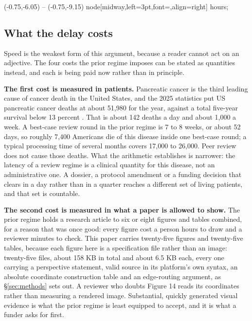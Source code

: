 \begin{appfloat}[!tb]
\begin{appfig}
  (-0.75,-6.05) -- (-0.75,-9.15) node[midway,left=3pt,font=\tiny\sffamily,align=right] {hours};
\end{appfig}
\vspace{-0.6cm}
\end{appfloat}

\subsection{What the delay costs}

Speed is the weakest form of this argument, because a reader cannot act on an
adjective. The four costs the prior regime imposes can be stated as quantities
instead, and each is being paid now rather than in principle.

\textbf{The first cost is measured in patients.} Pancreatic cancer is the third
leading cause of cancer death in the United States, and the 2025 statistics put
US pancreatic cancer deaths at about 51,980 for the year, against a total
five-year survival below 13 percent \cite{siegel2025statistics}. That is about
142 deaths a day and about 1,000 a week. A best-case review round in the prior
regime is 7 to 8 weeks, or about 52 days, so roughly 7,400 Americans die of this
disease inside one best-case round; a typical processing time of several months
covers 17,000 to 26,000. Peer review does not cause those deaths. What the
arithmetic establishes is narrower: the latency of a review regime is a clinical
quantity for this disease, not an administrative one. A dossier, a protocol
amendment or a funding decision that clears in a day rather than in a quarter
reaches a different set of living patients, and that set is countable.

\textbf{The second cost is measured in what a paper is allowed to show.} The
prior regime holds a research article to six or eight figures and tables
combined, for a reason that was once good: every figure cost a person hours to
draw and a reviewer minutes to check. This paper carries twenty-five figures and
twenty-five tables, because each figure here is a specification file rather than
an image: twenty-five files, about 158 KB in total and about 6.5 KB each, every
one carrying a perspective statement, valid source in its platform's own syntax,
an absolute coordinate construction table and an edge-routing argument, as
\S\ref{sec:methods} sets out. A reviewer who doubts Figure 14 reads its
coordinates rather than measuring a rendered image. Substantial, quickly
generated visual evidence is what the prior regime is least equipped to accept,
and it is what a funder asks for first.

